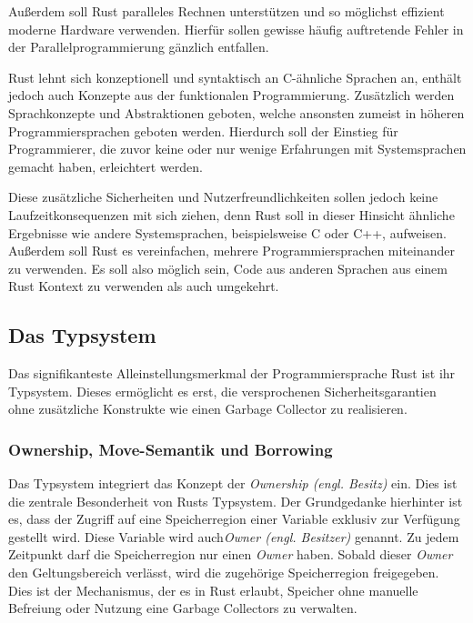 Außerdem soll Rust paralleles Rechnen unterstützen und so möglichst effizient moderne Hardware verwenden.
Hierfür sollen gewisse häufig auftretende Fehler in der Parallelprogrammierung gänzlich entfallen.
\cite{theRustLanguage}

Rust lehnt sich konzeptionell und syntaktisch an C-ähnliche Sprachen an, enthält jedoch auch Konzepte aus der
funktionalen Programmierung. Zusätzlich werden Sprachkonzepte und Abstraktionen geboten, welche
ansonsten zumeist in höheren Programmiersprachen geboten werden. Hierdurch soll der Einstieg für
Programmierer, die zuvor keine oder nur wenige Erfahrungen mit Systemsprachen gemacht haben, erleichtert werden.
\cite{engineeringServo}

Diese zusätzliche Sicherheiten und Nutzerfreundlichkeiten sollen jedoch keine Laufzeitkonsequenzen mit sich ziehen,
denn Rust soll in dieser Hinsicht ähnliche Ergebnisse wie andere Systemsprachen, beispielsweise C oder C++,
aufweisen. Außerdem soll Rust es vereinfachen, mehrere Programmiersprachen miteinander zu verwenden. Es soll
also möglich sein, Code aus anderen Sprachen aus einem Rust Kontext zu verwenden als auch umgekehrt.\cite{rustBook}


\subsection{Das Typsystem}

Das signifikanteste Alleinstellungsmerkmal der Programmiersprache Rust ist ihr Typsystem. Dieses ermöglicht es
erst, die versprochenen Sicherheitsgarantien ohne zusätzliche Konstrukte wie einen Garbage
Collector zu realisieren.\cite{rustBook}

\subsubsection{Ownership, Move-Semantik und Borrowing}

Das Typsystem integriert das Konzept der \textit{Ownership (engl. Besitz)} ein.
Dies ist die zentrale Besonderheit von Rusts Typsystem.
Der Grundgedanke hierhinter ist es, dass der Zugriff auf eine Speicherregion einer Variable exklusiv
zur Verfügung gestellt wird. Diese Variable wird auch\textit{Owner (engl. Besitzer)} genannt.
Zu jedem Zeitpunkt darf die Speicherregion nur einen \textit{Owner} haben.
Sobald dieser \textit{Owner} den Geltungsbereich verlässt, wird die zugehörige Speicherregion freigegeben.
Dies ist der Mechanismus, der es in Rust erlaubt, Speicher ohne manuelle Befreiung oder Nutzung eine
Garbage Collectors zu verwalten.\cite{rustBook}

